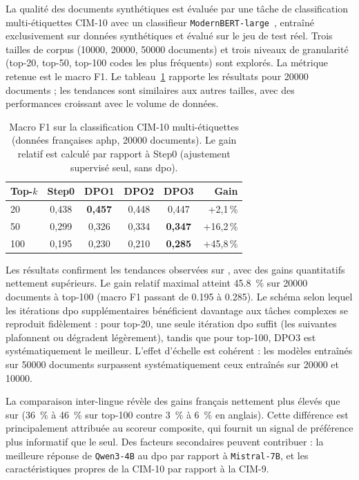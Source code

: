 La qualité des documents synthétiques est évaluée par une tâche de classification multi-étiquettes CIM-10 avec un classifieur \verb|ModernBERT-large|~\citep{warner2025smarter}, entraîné exclusivement sur données synthétiques et évalué sur le jeu de test réel.
Trois tailles de corpus (\num{10000}, \num{20000}, \num{50000} documents) et trois niveaux de granularité (top-20, top-50, top-100 codes les plus fréquents) sont explorés.
La métrique retenue est le macro F1.
Le tableau~\ref{tab:french-results} rapporte les résultats pour \num{20000} documents ; les tendances sont similaires aux autres tailles, avec des performances croissant avec le volume de données.

\begin{table}[htbp]
\centering
\small
\begin{tabular}{lccccr}
\toprule
\textbf{Top-$k$} & \textbf{Step0} & \textbf{DPO1} & \textbf{DPO2} & \textbf{DPO3} & \textbf{Gain} \\
\midrule
20  & 0,438 & \textbf{0,457} & 0,448 & 0,447 & +2,1\,\% \\
50  & 0,299 & 0,326 & 0,334 & \textbf{0,347} & +16,2\,\% \\
100 & 0,195 & 0,230 & 0,210 & \textbf{0,285} & +45,8\,\% \\
\bottomrule
\end{tabular}
\caption{Macro F1 sur la classification CIM-10 multi-étiquettes (données françaises \gls{aphp}, \num{20000} documents). Le gain relatif est calculé par rapport à Step0 (ajustement supervisé seul, sans \gls{dpo}).}
\label{tab:french-results}
\end{table}

Les résultats confirment les tendances observées sur \mimic{}, avec des gains quantitatifs nettement supérieurs.
Le gain relatif maximal atteint \SI{+45,8}{\percent} sur \num{20000} documents à top-100 (macro F1 passant de \num{0,195} à \num{0,285}).
Le schéma selon lequel les itérations \gls{dpo} supplémentaires bénéficient davantage aux tâches complexes se reproduit fidèlement : pour top-20, une seule itération \gls{dpo} suffit (les suivantes plafonnent ou dégradent légèrement), tandis que pour top-100, DPO3 est systématiquement le meilleur.
L'effet d'échelle est cohérent : les modèles entraînés sur \num{50000} documents surpassent systématiquement ceux entraînés sur \num{20000} et \num{10000}.

La comparaison inter-lingue révèle des gains français nettement plus élevés que sur \mimic{} (\SI{+36}{\percent} à \SI{+46}{\percent} sur top-100 contre \SI{+3}{\percent} à \SI{+6}{\percent} en anglais).
Cette différence est principalement attribuée au scoreur composite, qui fournit un signal de préférence plus informatif que le \score{} seul.
Des facteurs secondaires peuvent contribuer : la meilleure réponse de \verb|Qwen3-4B| au \gls{dpo} par rapport à \verb|Mistral-7B|, et les caractéristiques propres de la CIM-10 par rapport à la CIM-9.

